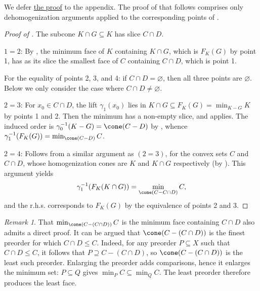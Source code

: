 \documentclass{article}
\theoremstyle{plain}
\theoremstyle{definition}
\theoremstyle{remark}
\newtheorem{remark}[remark]{Remark}
\begin{document}
We defer \hyperlink{loc:minima_dehomogenize_to_the_induced_order.proof}{the proof} to the appendix.
The proof of  that
follows comprises only dehomogenization arguments applied to the corresponding
points of .
\begin{proof}[\hypertarget{loc:characterization_of_the_generated_face_of_a_convex_set.proof}{}Proof of ]

The subcone $K \cap G \subseteq K$ has slice $C \cap D$.

$1 = 2$:
By , the minimum face of $K$ containing $K \cap G$, which is $F_K(G)$ by  point 1, has as its slice the smallest face of $C$ containing $C \cap D$, which is point 1.

For the equality of points 2, 3, and 4: if $C \cap D = \varnothing$, then all three points are $\varnothing$.
Below we only consider the case where $C \cap D \neq \varnothing$.

$2 = 3$:
For $x_0 \in C \cap D$, the lift $\gamma_1(x_0)$ lies in $K \cap G \subseteq F_K(G) = \min_{K-G}K$ by  points 1 and 2. Then the minimum has a non-empty slice, and  applies. The induced order is $\gamma_0^{-1}(K-G) = \cone(C-D)$ by , whence $\gamma_1^{-1}(F_K(G)) = \min_{\cone(C-D)}C$.

$2 = 4$:
Follows from a similar argument as $(2 = 3)$, for the convex sets $C$ and $C \cap D$, whose homogenization cones are $K$ and $K \cap G$ respectively (by ). This argument yields 
\begin{equation*}
\gamma_1^{-1}(F_K(K \cap G)) = \min_{\cone(C - C \cap D)} C,
\end{equation*}
and the r.h.s. corresponds to $F_K(G)$ by the equivalence of  points 2 and 3.
\end{proof}
\begin{remark}
\label{loc:characterization_of_the_generated_face_of_a_convex_set.monotonicity_remark}
That $\min_{\cone(C - (C \cap D))}C$ is the minimum face containing $C \cap D$ also admits a direct proof. It can be argued that $\cone(C - (C \cap D))$ is the finest preorder for which $C \cap D \leq C$. Indeed, for any preorder $P \subseteq X$ such that $C \cap D \leq C$, it follows that $P \supseteq C - (C \cap D)$, so $\cone(C - (C \cap D))$ is the least such preorder. Enlarging the preorder adds comparisons, hence it enlarges the minimum set: $P \subseteq Q$ gives $\min_P C \subseteq \min_Q C$. The least preorder therefore produces the least face.
\end{remark}
\end{document}
